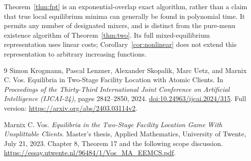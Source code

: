 \documentclass[11pt]{article}
\theoremstyle{definition}
\theoremstyle{remark}
\begin{document}
Theorem~\ref{thm:fpt} is an exponential-overlap exact algorithm, rather than a claim that true local equilibrium minima can generally be found in polynomial time. It permits any number of designated mixers, and is distinct from the pure-menu existence algorithm of Theorem~\ref{thm:two}. Its full mixed-equilibrium representation uses linear costs; Corollary~\ref{cor:nonlinear} does not extend this representation to arbitrary increasing functions.

\begin{thebibliography}{9}
Simon Krogmann, Pascal Lenzner, Alexander Skopalik, Marc Uetz, and Marnix C. Vos.
\newblock Equilibria in Two-Stage Facility Location with Atomic Clients.
\newblock In \emph{Proceedings of the Thirty-Third International Joint Conference on Artificial Intelligence (IJCAI-24)}, pages 2842--2850, 2024.
\newblock \href{https://doi.org/10.24963/ijcai.2024/315}{doi:10.24963/ijcai.2024/315}.
\newblock Full version: \url{https://arxiv.org/abs/2403.03114v2}.

Marnix C. Vos.
\newblock \emph{Equilibria in the Two-Stage Facility Location Game With Unsplittable Clients}.
\newblock Master's thesis, Applied Mathematics, University of Twente, July 21, 2023.
\newblock Chapter 8, Theorem 17 and the following scope discussion.
\newblock \url{https://essay.utwente.nl/96484/1/Vos_MA_EEMCS.pdf}.
\end{thebibliography}
\end{document}
